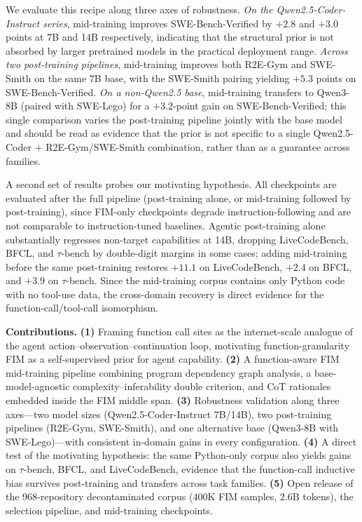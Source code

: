 We evaluate this recipe along three axes of robustness. \emph{On the
Qwen2.5-Coder-Instruct series}, mid-training improves SWE-Bench-Verified
by $+2.8$ and $+3.0$ points at 7B and 14B respectively, indicating that
the structural prior is not absorbed by larger pretrained models in the
practical deployment range. \emph{Across two post-training pipelines},
mid-training improves both R2E-Gym and SWE-Smith on the same 7B base,
with the SWE-Smith pairing yielding $+5.3$ points on SWE-Bench-Verified.
\emph{On a non-Qwen2.5 base}, mid-training transfers to Qwen3-8B (paired
with SWE-Lego) for a $+3.2$-point gain on SWE-Bench-Verified; this single
comparison varies the post-training pipeline jointly with the base model
and should be read as evidence that the prior is not specific to a single
Qwen2.5-Coder $+$ R2E-Gym/SWE-Smith combination, rather than as a
guarantee across families.

A second set of results probes our motivating hypothesis. All checkpoints
are evaluated after the full pipeline (post-training alone, or
mid-training followed by post-training), since FIM-only checkpoints
degrade instruction-following and are not comparable to instruction-tuned
baselines. Agentic post-training alone substantially regresses non-target
capabilities at 14B, dropping LiveCodeBench, BFCL, and $\tau$-bench by
double-digit margins in some cases; adding mid-training before the same
post-training restores $+11.1$ on LiveCodeBench, $+2.4$ on BFCL, and
$+3.9$ on $\tau$-bench. Since the mid-training corpus contains only
Python code with no tool-use data, the cross-domain recovery is direct
evidence for the function-call/tool-call isomorphism.

\textbf{Contributions.}
\textbf{(1)} Framing function call sites as the internet-scale analogue of
the agent action--observation--continuation loop, motivating
function-granularity FIM as a self-supervised prior for agent capability.
\textbf{(2)} A function-aware FIM mid-training pipeline combining program
dependency graph analysis, a base-model-agnostic
complexity--inferability double criterion, and CoT rationales embedded
inside the FIM middle span.
\textbf{(3)} Robustness validation along three axes---two model sizes
(Qwen2.5-Coder-Instruct 7B/14B), two post-training pipelines (R2E-Gym, SWE-Smith),
and one alternative base (Qwen3-8B with SWE-Lego)---with consistent
in-domain gains in every configuration.
\textbf{(4)} A direct test of the motivating hypothesis: the same
Python-only corpus also yields gains on $\tau$-bench, BFCL, and
LiveCodeBench, evidence that the function-call inductive bias survives
post-training and transfers across task families.
\textbf{(5)} Open release of the 968-repository decontaminated corpus
($400\mathrm{K}$ FIM samples, $2.6\mathrm{B}$ tokens),
the selection pipeline, and mid-training checkpoints.